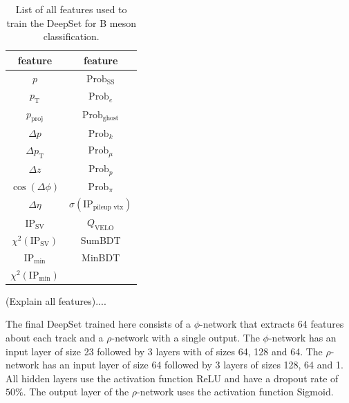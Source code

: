 \begin{table}
    \centering
    \caption{List of all features used to train the DeepSet for B meson classification.}
    \label{tab:B_features}
    \begin{tabular}{c c}
        \toprule
        feature & feature \\
        \midrule
        $p$                 & $\text{Prob}_\text{SS}$ \\ %
        $p_\text{T}$        & $\text{Prob}_e$ \\ %
        $p_\text{proj}$     & $\text{Prob}_\text{ghost}$ \\ %
        $\Delta p$          & $\text{Prob}_k$ \\ %
        $\Delta p_\text{T}$ & $\text{Prob}_\mu$ \\ %
        $\Delta z$          & $\text{Prob}_p$ \\ %
        $\cos(\Delta \phi)$ & $\text{Prob}_\pi$ \\ %
        $\Delta \eta$       & $\sigma(\text{IP}_\text{pileup vtx})$ \\ %
        $\text{IP}_\text{SV}$        & $Q_\text{VELO}$ \\ %
        $\chi^2(\text{IP}_\text{SV})$    & SumBDT \\ %
        $\text{IP}_\text{min}$               & MinBDT \\ %
        $\chi^2(\text{IP}_\text{min})$           & \\ %
        \bottomrule
    \end{tabular}
\end{table}

(Explain all features)....

The final DeepSet trained here consists of a $\phi$-network that extracts 64 features about each track and a $\rho$-network with a single output.
The $\phi$-network has an input layer of size 23 followed by 3 layers with of sizes 64, 128 and 64.
The $\rho$-network has an input layer of size 64 followed by 3 layers of sizes 128, 64 and 1.
All hidden layers use the activation function ReLU and have a dropout rate of $50\%$.
The output layer of the $\rho$-network uses the activation function Sigmoid.

